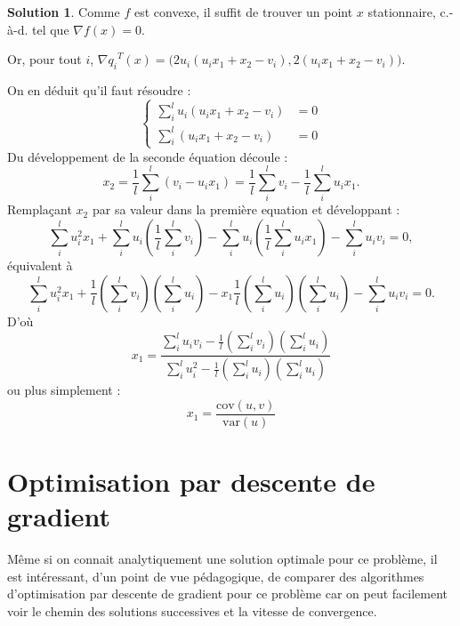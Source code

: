 \documentclass[a4paper,francais]{article}
\newcommand{\cad}{c.-à-d.}
\theoremstyle{definition}
\newtheorem*{solution}{Solution}
\begin{document}
\begin{solution}
  Comme $f$ est convexe, il suffit de trouver un point $x$ stationnaire,
  {\cad} tel que $\nabla f(x) = 0$.

  Or, pour tout $i$, ${\nabla q_i}^T(x) = \big( 2u_i (u_ix_1 + x_2 - v_i), 2(u_ix_1 + x_2 - v_i) \big)$.

  On en déduit qu'il faut résoudre :
  \[
  \left\{
  \begin{array}{cc}
    \sum_i^l u_i (u_ix_1 + x_2 - v_i) &= 0 \\
    \sum_i^l (u_ix_1 + x_2 - v_i) &= 0
  \end{array}
  \right.
  \]
  Du développement de la seconde équation découle :
  \[
  x_2 = \frac{1}{l} \sum_i^l (v_i - u_ix_1) = \frac{1}{l} \sum_i^l v_i - \frac{1}{l} \sum_i^l u_ix_1. 
  \]
  Remplaçant $x_2$ par sa valeur dans la première equation et développant :
  \[
  \sum_i^l u_i^2 x_1 + \sum_i^l u_i (\frac{1}{l} \sum_i^l v_i) - \sum_i^l u_i (\frac{1}{l} \sum_i^l u_ix_1) - \sum_i^l u_iv_i = 0,
  \]
  équivalent à 
  \[
  \sum_i^l u_i^2 x_1 + \frac{1}{l} (\sum_i^l v_i)(\sum_i^l u_i) - x_1 \frac{1}{l} (\sum_i^l u_i)(\sum_i^l u_i)  - \sum_i^l u_iv_i = 0.
  \]
  D'où
  \[
  x_1 = \frac{\sum_i^l u_iv_i - \frac{1}{l} (\sum_i^l v_i)(\sum_i^l u_i)}{\sum_i^l u_i^2 - \frac{1}{l} (\sum_i^l u_i)(\sum_i^l u_i)}
  \]
  ou plus simplement :
  \[
  x_1 = \frac{ \text{cov}(u,v) }{ \text{var}(u) } 
  \]
  
\end{solution}

\section{Optimisation par descente de gradient}

Même si on connait analytiquement une solution optimale pour ce problème, il est intéressant,
d'un point de vue pédagogique, de comparer des algorithmes d'optimisation par descente de
gradient pour ce problème car on peut facilement voir le chemin des solutions successives et
la vitesse de convergence.



%
%
\end{document}
